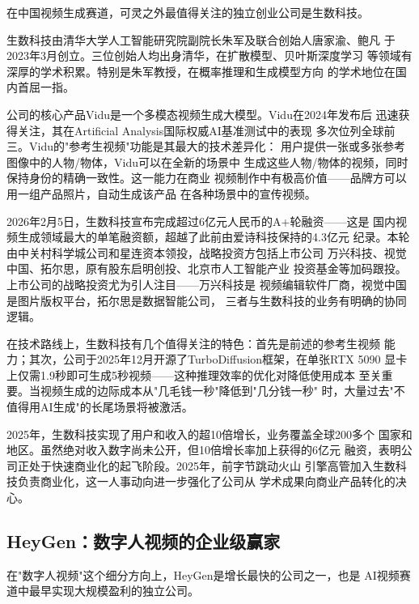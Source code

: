 在中国视频生成赛道，可灵之外最值得关注的独立创业公司是生数科技。

生数科技由清华大学人工智能研究院副院长朱军及联合创始人唐家渝、鲍凡
于2023年3月创立。三位创始人均出身清华，在扩散模型、贝叶斯深度学习
等领域有深厚的学术积累。特别是朱军教授，在概率推理和生成模型方向
的学术地位在国内首屈一指。

公司的核心产品Vidu是一个多模态视频生成大模型。Vidu在2024年发布后
迅速获得关注，其在Artificial Analysis国际权威AI基准测试中的表现
多次位列全球前三。Vidu的"参考生视频"功能是其最大的技术差异化：
用户提供一张或多张参考图像中的人物/物体，Vidu可以在全新的场景中
生成这些人物/物体的视频，同时保持身份的精确一致性。这一能力在商业
视频制作中有极高价值——品牌方可以用一组产品照片，自动生成该产品
在各种场景中的宣传视频。

2026年2月5日，生数科技宣布完成超过6亿元人民币的A+轮融资——这是
国内视频生成领域最大的单笔融资额，超越了此前由爱诗科技保持的4.3亿元
纪录。本轮由中关村科学城公司和星连资本领投，战略投资方包括上市公司
万兴科技、视觉中国、拓尔思，原有股东启明创投、北京市人工智能产业
投资基金等加码跟投。上市公司的战略投资尤为引人注目——万兴科技是
视频编辑软件厂商，视觉中国是图片版权平台，拓尔思是数据智能公司，
三者与生数科技的业务有明确的协同逻辑。

在技术路线上，生数科技有几个值得关注的特色：首先是前述的参考生视频
能力；其次，公司于2025年12月开源了TurboDiffusion框架，在单张RTX 5090
显卡上仅需1.9秒即可生成5秒视频——这种推理效率的优化对降低使用成本
至关重要。当视频生成的边际成本从"几毛钱一秒"降低到"几分钱一秒"
时，大量过去"不值得用AI生成"的长尾场景将被激活。

2025年，生数科技实现了用户和收入的超10倍增长，业务覆盖全球200多个
国家和地区。虽然绝对收入数字尚未公开，但10倍增长率加上获得的6亿元
融资，表明公司正处于快速商业化的起飞阶段。2025年，前字节跳动火山
引擎高管加入生数科技负责商业化，这一人事动向进一步强化了公司从
学术成果向商业产品转化的决心。

\subsection{HeyGen：数字人视频的企业级赢家}
\label{subsec:heygen}

在"数字人视频"这个细分方向上，HeyGen是增长最快的公司之一，也是
AI视频赛道中最早实现大规模盈利的独立公司。

